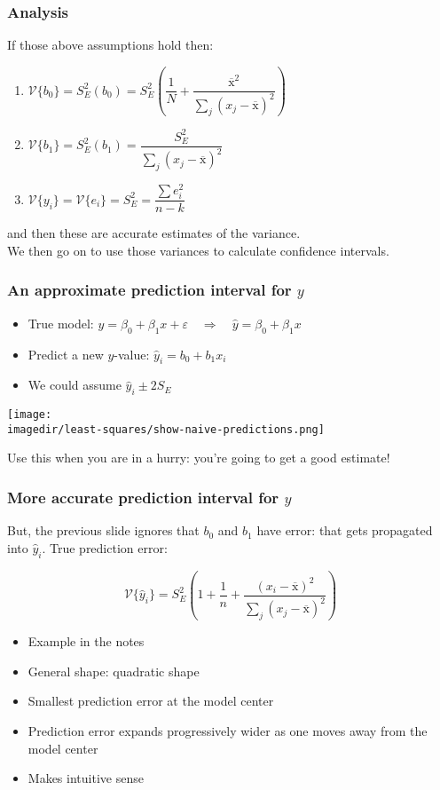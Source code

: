 \begin{frame}\frametitle{Analysis}
	If those above assumptions hold then:
	\begin{enumerate}
		\item	$\mathcal{V}\{b_0\} = S_E^2(b_0) = S_E^2 \left(\dfrac{1}{N} + \dfrac{\overline{\mathrm{x}}^2}{\sum_j{\left( x_j - \overline{\mathrm{x}} \right)^2}} \right)$
		\item	$\mathcal{V}\{b_1\} = S_E^2(b_1) = \dfrac{S_E^2}{\sum_j{\left( x_j - \overline{\mathrm{x}} \right)^2}}$
		\item	$\mathcal{V}\{y_i\} = \mathcal{V}\{e_i\} = S_E^2 = \dfrac{\sum{e_i^2}}{n-k}$
	\end{enumerate}
	\vspace{12pt}
	and then these are accurate estimates of the variance.\\
	We then go on to use those variances to calculate confidence intervals.
\end{frame}

\begin{frame}\frametitle{An approximate prediction interval for $y$}
	\begin{itemize}
		\item	True model: $y = \beta_0 + \beta_1 x + \varepsilon \quad \Longrightarrow \quad \hat{y} = \beta_0 + \beta_1 x$
		\item	Predict a new $y$-value: $\hat{y}_i = b_0 + b_1 x_i$
		\item	We could assume $\hat{y}_i \pm 2S_E$
	\end{itemize}
	\vspace{-6pt}
	\begin{center}
		\texttt{[image: \\imagedir/least-squares/show-naive-predictions.png]}
	\end{center}
	\vspace{-6pt}
	Use this when you are in a hurry: {\small you're going to get a good estimate!}
\end{frame}

\begin{frame}\frametitle{More accurate prediction interval for $y$}
	But, the previous slide ignores that $b_0$ and $b_1$ have error: that gets propagated into $\hat{y}_i$. True prediction error:
	\begin{exampleblock}{}
		$$\mathcal{V}\{\hat{y}_i\} = S_E^2 \left(1 + \dfrac{1}{n} + \dfrac{(x_i - \overline{\mathrm{x}})^2}{\sum_j{\left( x_j - \overline{\mathrm{x}} \right)^2}}\right)$$
	\end{exampleblock}
	\begin{itemize}
		\item	Example in the notes
		\item	General shape: quadratic shape
		\item	Smallest prediction error at the model center
		\item	Prediction error expands progressively wider as one moves away from the model center
		\item	Makes intuitive sense
	\end{itemize}
\end{frame}

